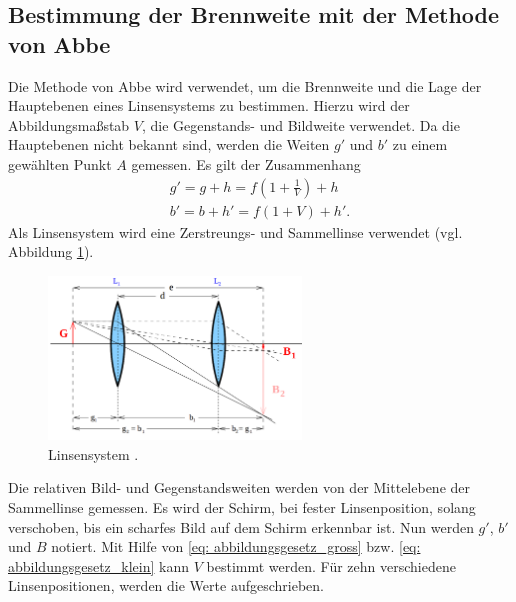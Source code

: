 \subsection{Bestimmung der Brennweite mit der Methode von Abbe}
Die Methode von Abbe wird verwendet, um die Brennweite und die Lage der Hauptebenen
eines Linsensystems zu bestimmen. Hierzu wird der Abbildungsmaßstab $V$,
die Gegenstands- und Bildweite verwendet. Da die Hauptebenen nicht bekannt sind,
werden die Weiten $g'$ und $b'$ zu einem gewählten Punkt $A$ gemessen.
Es gilt der Zusammenhang
\begin{align}
    g'=g+h=f\left(1+\frac{1}{V}\right)+h \label{eq: abstaende_abbe_g} \\
    b'=b+h'=f\left(1+V\right)+h' \label{eq: abstaende_abbe_b}.
\end{align}
Als Linsensystem wird eine Zerstreungs- und Sammellinse verwendet (vgl. Abbildung \ref{fig: linsensystem}).
\begin{figure}
    \centering
    \includegraphics[width=0.6\textwidth]{./pics/linsensystem.png}
    \caption{Linsensystem \cite{anleitung408}.}
    \label{fig: linsensystem}
\end{figure}
Die relativen Bild- und Gegenstandsweiten werden von der Mittelebene
der Sammellinse gemessen.
Es wird der Schirm, bei fester Linsenposition, solang verschoben, bis ein scharfes
Bild auf dem Schirm erkennbar ist. Nun werden $g'$, $b'$ und $B$ notiert.
Mit Hilfe von \eqref{eq: abbildungsgesetz_gross} bzw. \eqref{eq: abbildungsgesetz_klein}
kann $V$ bestimmt werden.
Für zehn verschiedene Linsenpositionen, werden die Werte aufgeschrieben.
